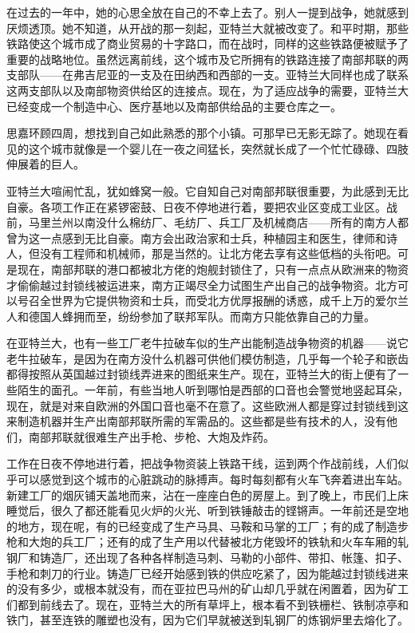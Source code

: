 \par 在过去的一年中，她的心思全放在自己的不幸上去了。别人一提到战争，她就感到厌烦透顶。她不知道，从开战的那一刻起，亚特兰大就被改变了。和平时期，那些铁路使这个城市成了商业贸易的十字路口，而在战时，同样的这些铁路便被赋予了重要的战略地位。虽然远离前线，这个城市及它所拥有的铁路连接了南部邦联的两支部队——在弗吉尼亚的一支及在田纳西和西部的一支。亚特兰大同样也成了联系这两支部队以及南部物资供给区的连接点。现在，为了适应战争的需要，亚特兰大已经变成一个制造中心、医疗基地以及南部供给品的主要仓库之一。
\par 思嘉环顾四周，想找到自己如此熟悉的那个小镇。可那早已无影无踪了。她现在看见的这个城市就像是一个婴儿在一夜之间猛长，突然就长成了一个忙忙碌碌、四肢伸展着的巨人。
\par 亚特兰大喧闹忙乱，犹如蜂窝一般。它自知自己对南部邦联很重要，为此感到无比自豪。各项工作正在紧锣密鼓、日夜不停地进行着，要把农业区变成工业区。战前，马里兰州以南没什么棉纺厂、毛纺厂、兵工厂及机械商店——所有的南方人都曾为这一点感到无比自豪。南方会出政治家和士兵，种植园主和医生，律师和诗人，但没有工程师和机械师，那是当然的。让北方佬去享有这些低档的头衔吧。可是现在，南部邦联的港口都被北方佬的炮舰封锁住了，只有一点点从欧洲来的物资才偷偷越过封锁线被运进来，南方正竭尽全力试图生产出自己的战争物资。北方可以号召全世界为它提供物资和士兵，而受北方优厚报酬的诱惑，成千上万的爱尔兰人和德国人蜂拥而至，纷纷参加了联邦军队。而南方只能依靠自己的力量。
\par 在亚特兰大，也有一些工厂老牛拉破车似的生产出能制造战争物资的机器——说它老牛拉破车，是因为在南方没什么机器可供他们模仿制造，几乎每一个轮子和嵌齿都得按照从英国越过封锁线弄进来的图纸来生产。现在，亚特兰大的街上便有了一些陌生的面孔。一年前，有些当地人听到哪怕是西部的口音也会警觉地竖起耳朵，现在，就是对来自欧洲的外国口音也毫不在意了。这些欧洲人都是穿过封锁线到这来制造机器并生产出南部邦联所需的军需品的。这些都是些有技术的人，没有他们，南部邦联就很难生产出手枪、步枪、大炮及炸药。
\par 工作在日夜不停地进行着，把战争物资装上铁路干线，运到两个作战前线，人们似乎可以感觉到这个城市的心脏跳动的脉搏声。每时每刻都有火车飞奔着进出车站。新建工厂的烟灰铺天盖地而来，沾在一座座白色的房屋上。到了晚上，市民们上床睡觉后，很久了都还能看见火炉的火光、听到铁锤敲击的铿锵声。一年前还是空地的地方，现在呢，有的已经变成了生产马具、马鞍和马掌的工厂；有的成了制造步枪和大炮的兵工厂；还有的成了生产用以代替被北方佬毁坏的铁轨和火车车厢的轧钢厂和铸造厂，还出现了各种各样制造马刺、马勒的小部件、带扣、帐篷、扣子、手枪和刺刀的行业。铸造厂已经开始感到铁的供应吃紧了，因为能越过封锁线进来的没有多少，或根本就没有，而在亚拉巴马州的矿山却几乎就在闲置着，因为矿工们都到前线去了。现在，亚特兰大的所有草坪上，根本看不到铁栅栏、铁制凉亭和铁门，甚至连铁的雕塑也没有，因为它们早就被送到轧钢厂的炼钢炉里去熔化了。
